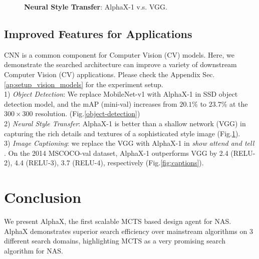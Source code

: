 \documentclass[10pt,twocolumn,letterpaper]{article}
\begin{document}
\begin{figure}[t]
\begin{center}
\caption{ \textbf{Neural Style Transfer}: AlphaX-1 v.s. VGG.}
\vspace{-0.2in}
\end{center}
\label{neural-style-transfer}
\vspace{-0.2in}
\end{figure}



\subsection{Improved Features for Applications}

CNN is a common component for Computer Vision (CV) models. Here, we demonstrate the searched architecture can improve a variety of downstream Computer Vision (CV) applications. Please check the Appendix Sec.\ref{ap:setup_vision_models} for the experiment setup. \\
1) \textit{Object Detection}: We replace MobileNet-v1 with AlphaX-1 in SSD \cite{liu2016ssd} object detection model, and the mAP (mini-val) increases from $20.1\%$ to $23.7\%$ at the $300\times300$ resolution. (Fig.\ref{object-detection}) \\
2) \textit{Neural Style Transfer}: AlphaX-1 is better than a shallow network (VGG) in capturing the rich details and textures of a sophisticated style image (Fig.\ref{neural-style-transfer}). \\
3) \textit{Image Captioning}: we replace the VGG with AlphaX-1 in \textit{show attend and tell} \cite{xu2015show}. On the 2014 MSCOCO-val dataset, AlphaX-1 outperforms VGG by 2.4 (RELU-2), 4.4 (RELU-3), 3.7 (RELU-4), respectively (Fig.\ref{fig:captions}).

\section{Conclusion}
We present AlphaX, the first scalable MCTS based design agent for NAS. AlphaX demonstrates superior search efficiency over mainstream algorithms on 3 different search domains, highlighting MCTS as a very promising search algorithm for NAS.
\end{document}
